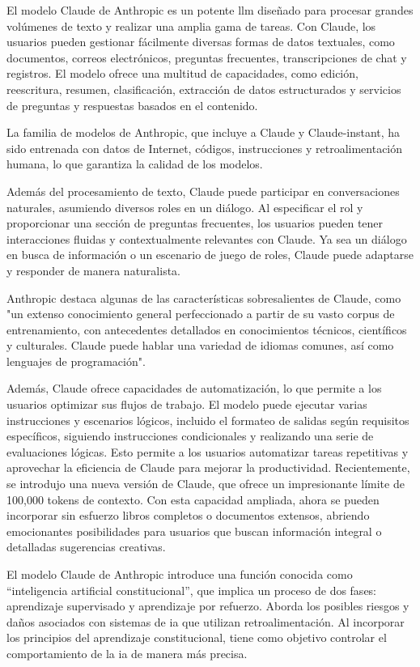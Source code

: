 El modelo Claude de Anthropic es un potente \acrshort{llm} diseñado para procesar grandes volúmenes de texto y realizar una amplia gama de tareas. Con Claude, los usuarios pueden gestionar fácilmente diversas formas de datos textuales, como documentos, correos electrónicos, preguntas frecuentes, transcripciones de chat y registros. El modelo ofrece una multitud de capacidades, como edición, reescritura, resumen, clasificación, extracción de datos estructurados y servicios de preguntas y respuestas basados en el contenido.

La familia de modelos de Anthropic, que incluye a Claude y Claude-instant, ha sido entrenada con datos de Internet, códigos, instrucciones y retroalimentación humana, lo que garantiza la calidad de los modelos.

Además del procesamiento de texto, Claude puede participar en conversaciones naturales, asumiendo diversos roles en un diálogo. Al especificar el rol y proporcionar una sección de preguntas frecuentes, los usuarios pueden tener interacciones fluidas y contextualmente relevantes con Claude. Ya sea un diálogo en busca de información o un escenario de juego de roles, Claude puede adaptarse y responder de manera naturalista.

Anthropic destaca algunas de las características sobresalientes de Claude, como "un extenso conocimiento general perfeccionado a partir de su vasto corpus de entrenamiento, con antecedentes detallados en conocimientos técnicos, científicos y culturales. Claude puede hablar una variedad de idiomas comunes, así como lenguajes de programación"\cite{Anthropic}.

Además, Claude ofrece capacidades de automatización, lo que permite a los usuarios optimizar sus flujos de trabajo. El modelo puede ejecutar varias instrucciones y escenarios lógicos, incluido el formateo de salidas según requisitos específicos, siguiendo instrucciones condicionales y realizando una serie de evaluaciones lógicas. Esto permite a los usuarios automatizar tareas repetitivas y aprovechar la eficiencia de Claude para mejorar la productividad. Recientemente, se introdujo una nueva versión de Claude, que ofrece un impresionante límite de 100,000 tokens de contexto. Con esta capacidad ampliada, ahora se pueden incorporar sin esfuerzo libros completos o documentos extensos, abriendo emocionantes posibilidades para usuarios que buscan información integral o detalladas sugerencias creativas.

El modelo Claude de Anthropic introduce una función conocida como ``inteligencia artificial constitucional'', que implica un proceso de dos fases: aprendizaje supervisado y aprendizaje por refuerzo. Aborda los posibles riesgos y daños asociados con sistemas de \acrlong{ia} que utilizan retroalimentación. Al incorporar los principios del aprendizaje constitucional, tiene como objetivo controlar el comportamiento de la \acrshort{ia} de manera más precisa.

